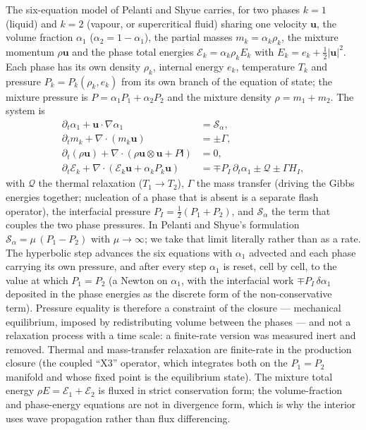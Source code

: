 \documentclass[11pt,a4paper]{article}
\newcommand{\uvec}{\mathbf{u}}
\newcommand{\Ivec}{\mathsf{I}}
\begin{document}
The six-equation model of Pelanti and Shyue carries, for two phases
$k = 1$ (liquid) and $k = 2$ (vapour, or supercritical fluid) sharing
one velocity $\uvec$, the volume fraction $\alpha_1$
($\alpha_2 = 1 - \alpha_1$), the partial masses $m_k = \alpha_k\rho_k$,
the mixture momentum $\rho\uvec$ and the phase total energies
$\mathcal{E}_k = \alpha_k\rho_k E_k$ with $E_k = e_k + \tfrac12|\uvec|^2$.
Each phase has its own density $\rho_k$, internal energy $e_k$,
temperature $T_k$ and pressure $P_k = P_k(\rho_k, e_k)$ from its own
branch of the equation of state; the mixture pressure is
$P = \alpha_1 P_1 + \alpha_2 P_2$ and the mixture density
$\rho = m_1 + m_2$.  The system is
\begin{align}
  \partial_t\alpha_1 + \uvec\!\cdot\!\nabla\alpha_1 &= \mathcal{S}_\alpha, \\
  \partial_t m_k + \nabla\!\cdot\!(m_k\uvec) &= \pm\Gamma, \\
  \partial_t(\rho\uvec) + \nabla\!\cdot\!(\rho\uvec\otimes\uvec + P\Ivec) &= 0, \\
  \partial_t\mathcal{E}_k + \nabla\!\cdot\!(\mathcal{E}_k\uvec + \alpha_k P_k\uvec)
    &= \mp P_I\,\partial_t\alpha_1 \pm \mathcal{Q} \pm \Gamma H_I ,
\end{align}
with $\mathcal{Q}$ the thermal relaxation ($T_1 \to T_2$), $\Gamma$ the
mass transfer (driving the Gibbs energies together; nucleation of a
phase that is absent is a separate flash operator), the interfacial
pressure $P_I = \tfrac12(P_1 + P_2)$, and $\mathcal{S}_\alpha$ the term
that couples the two phase pressures.  In Pelanti and Shyue's
formulation $\mathcal{S}_\alpha = \mu\,(P_1 - P_2)$ with $\mu \to
\infty$; we take that limit literally rather than as a rate.  The
hyperbolic step advances the six equations with $\alpha_1$ advected and
each phase carrying its own pressure, and after every step $\alpha_1$
is reset, cell by cell, to the value at which $P_1 = P_2$ (a Newton on
$\alpha_1$, with the interfacial work $\mp P_I\,\delta\alpha_1$
deposited in the phase energies as the discrete form of the
non-conservative term).  Pressure equality is therefore a constraint of
the closure --- mechanical equilibrium, imposed by redistributing
volume between the phases --- and not a relaxation process with a time
scale: a finite-rate version was measured inert and removed.  Thermal
and mass-transfer relaxation are finite-rate in the production closure
(the coupled ``X3'' operator, which integrates both on the $P_1 = P_2$
manifold and whose fixed point is the equilibrium state).  The mixture
total energy $\rho E = \mathcal{E}_1 + \mathcal{E}_2$ is fluxed in
strict conservation form; the volume-fraction and phase-energy
equations are not in divergence form, which is why the interior uses
wave propagation rather than flux differencing.
\end{document}
